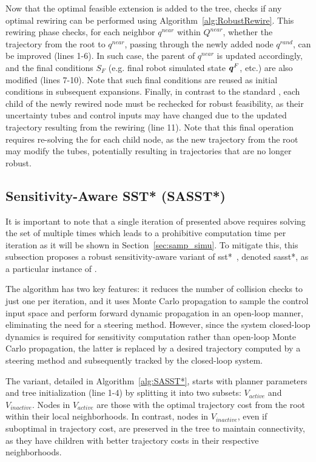 Now that the optimal feasible extension is added to the tree,  checks if any optimal rewiring can be performed using Algorithm~\ref{alg:RobustRewire}.
This rewiring phase checks, for each neighbor $q^{near}$ within $Q^{near}$, whether the trajectory from the root to $q^{near}$, passing through the newly added node $q^{rand}$, can be improved (lines 1-6).
In such case, the parent of $q^{near}$ is updated accordingly, and the final  conditions $S_F$ (e.g. final robot simulated state $\boldsymbol{q}^F$, etc.) are also modified (lines 7-10).
Note that such final conditions are reused as initial conditions in subsequent expansions.
Finally, in contrast to the standard , each child of the newly rewired node must be rechecked for robust feasibility, as their uncertainty tubes and control inputs may have changed due to the updated trajectory resulting from the rewiring (line 11).
Note that this final operation requires re-solving the  for each child node, as the new trajectory from the root may modify the tubes, potentially resulting in trajectories that are no longer robust.

\subsection{Sensitivity-Aware SST* (SASST*)}\label{sec:sasst*}

It is important to note that a single iteration of  presented above requires solving the set of  multiple times which leads to a prohibitive computation time per iteration as it will be shown in Section~\ref{sec:samp_simu}.
To mitigate this, this subsection proposes a robust sensitivity-aware variant of \gls{sst*}~\cite{cSST}, denoted \gls{sasst*}, as a particular instance of . 

The  algorithm has two key features: it reduces the number of collision checks to just one per iteration, and it uses Monte Carlo propagation to sample the control input space and perform forward dynamic propagation in an open-loop manner, eliminating the need for a steering method.
However, since the system closed-loop dynamics is required for sensitivity computation rather than open-loop Monte Carlo propagation, the latter is replaced by a desired trajectory computed by a steering method and subsequently tracked by the closed-loop system.

The  variant, detailed in Algorithm~\ref{alg:SASST*}, starts with planner parameters and tree initialization (line 1-4) by splitting it into two subsets: $V_{active}$ and $V_{inactive}.$
Nodes in $V_{active}$ are those with the optimal trajectory cost from the root within their local neighborhoods. 
In contrast, nodes in $V_{inactive}$, even if suboptimal in trajectory cost, are preserved in the tree to maintain connectivity, as they have children with better trajectory costs in their respective neighborhoods. 

